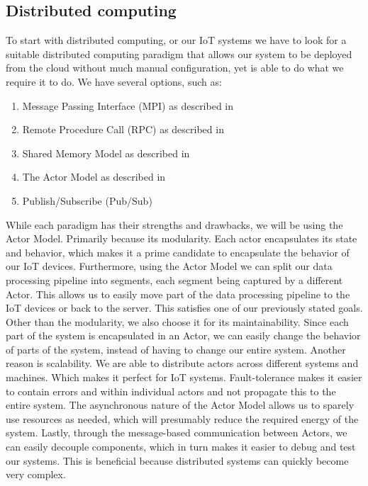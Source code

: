 \documentclass[a4paper]{article}
\begin{document}
\subsection{Distributed computing}
To start with distributed computing, or our IoT systems we have to look for a suitable distributed computing paradigm that allows our system to be deployed from the cloud without much manual configuration, yet is able to do what we require it to do. We have several options, such as:
\begin{enumerate}
    \item Message Passing Interface (MPI) as described in \cite{MPI}
    \item Remote Procedure Call (RPC) as described in \cite{RPC}
    \item Shared Memory Model as described in \cite{SMM}
    \item The Actor Model as described in \cite{ActorModel}
    \item Publish/Subscribe (Pub/Sub)
\end{enumerate}
While each paradigm has their strengths and drawbacks, we will be using the Actor Model. Primarily because its modularity. Each actor encapsulates its state and behavior, which makes it a prime candidate to encapsulate the behavior of our IoT devices. Furthermore, using the Actor Model we can split our data processing pipeline into segments, each segment being captured by a different Actor. This allows us to easily move part of the data processing pipeline to the IoT devices or back to the server. This satisfies one of our previously stated goals. Other than the modularity, we also choose it for its maintainability. Since each part of the system is encapsulated in an Actor, we can easily change the behavior of parts of the system, instead of having to change our entire system. Another reason is scalability. We are able to distribute actors across different systems and machines. Which makes it perfect for IoT systems. Fault-tolerance makes it easier to contain errors and within individual actors and not propagate this to the entire system. The asynchronous nature of the Actor Model allows us to sparely use resources as needed, which will presumably reduce the required energy of the system. Lastly, through the message-based communication between Actors, we can easily decouple components, which in turn makes it easier to debug and test our systems. This is beneficial because distributed systems can quickly become very complex.


\printbibliography
\end{document}
